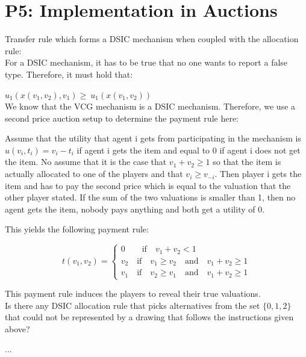 \documentclass{article}
\newcommand{\enterProblemHeader}[1]{
\nobreak\extramarks{#1}{#1 continued on next page\ldots}\nobreak
\nobreak\extramarks{#1 (continued)}{#1 continued on next page\ldots}\nobreak
}
\newcommand{\exitProblemHeader}[1]{
\nobreak\extramarks{#1 (continued)}{#1 continued on next page\ldots}\nobreak
\nobreak\extramarks{#1}{}\nobreak
}
\newcounter{homeworkProblemCounter} %
\newcommand{\homeworkProblemName}{}
\newenvironment{ex}[1][Problem \arabic{homeworkProblemCounter}]{ %
\stepcounter{homeworkProblemCounter} %
\renewcommand{\homeworkProblemName}{#1} %
\section{\homeworkProblemName} %
}{
}
\begin{document}
\begin{ex}[P5: Implementation in Auctions]
	Transfer rule which forms a DSIC mechanism when coupled with the allocation rule:\\
	
	For a DSIC mechanism, it has to be true that no one wants to report a false type. Therefore, it must hold that:
	
	$u_1(x(v_1,v_2),v_1) \geq\ u_1(x(v_1,v_2))$\\
	
	We know that the VCG mechanism is a DSIC mechanism. Therefore, we use a second price auction setup to determine the payment rule here:
	
	Assume that the utility that agent i gets from participating in the mechanism is $u(v_i, t_i)=v_i-t_i$ if agent i gets the item and equal to 0 if agent i does not get the item.
	No assume that it is the case that $v_1+v_2 \geq 1$ so that the item is actually allocated to one of the players and that $v_i \geq v_{-i}$. Then player i gets the item and has to pay the second price which is equal to the valuation that the other player stated.
	If the sum of the two valuations is smaller than 1, then no agent gets the item, nobody pays anything and both get a utility of 0.
	
	This yields the following payment rule:
	
	$$t(v_1,v_2)=\begin{cases}
	0 \qquad \text{if} \quad v_{1}+v_{2}<1\\
	v_2 \quad \text{if} \quad v_{1} \geq v_{2} \quad \text{and} \quad v_{1}+v_{2} \geq 1\\
	v_1 \quad \text{if} \quad v_{2} \geq v_{1} \quad \text{and} \quad v_{1}+v_{2} \geq 1 
	\end{cases}$$
	
	This payment rule induces the players to reveal their true valuations.\\
	
	
	Is there any DSIC allocation rule that picks alternatives from the set $\{0,1,2\}$ that could not be represented by a drawing that follows the instructions given above?
	
	...
	
	
	

\end{ex}
\end{document}
